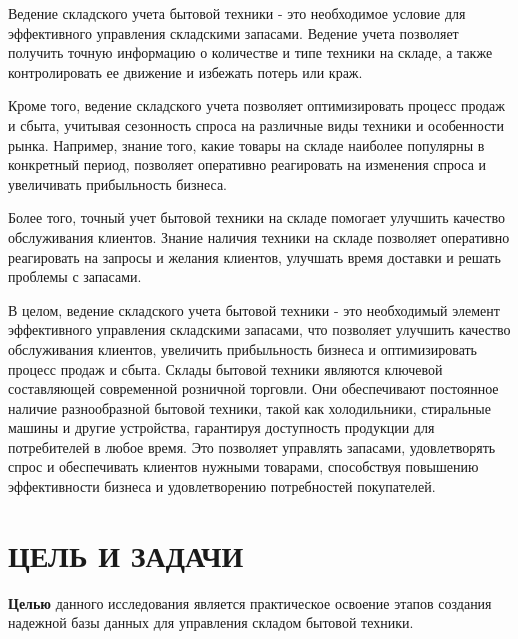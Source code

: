 \documentclass[14pt]{extreport}
\begin{document}
\setlength{\parindent}{1.25cm} %
\pagestyle{empty}


\pagestyle{plain} %

\tableofcontents

\intro\label{intro}

Ведение складского учета бытовой техники - это необходимое условие для эффективного управления складскими запасами. Ведение учета позволяет получить точную информацию о количестве и типе техники на складе, а также контролировать ее движение и избежать потерь или краж.

Кроме того, ведение складского учета позволяет оптимизировать процесс продаж и сбыта, учитывая сезонность спроса на различные виды техники и особенности рынка. Например, знание того, какие товары на складе наиболее популярны в конкретный период, позволяет оперативно реагировать на изменения спроса и увеличивать прибыльность бизнеса.

Более того, точный учет бытовой техники на складе помогает улучшить качество обслуживания клиентов. Знание наличия техники на складе позволяет оперативно реагировать на запросы и желания клиентов, улучшать время доставки и решать проблемы с запасами.

В целом, ведение складского учета бытовой техники - это необходимый элемент эффективного управления складскими запасами, что позволяет улучшить качество обслуживания клиентов, увеличить прибыльность бизнеса и оптимизировать процесс продаж и сбыта. Склады бытовой техники являются ключевой составляющей современной розничной торговли. Они обеспечивают постоянное наличие разнообразной бытовой техники, такой как холодильники, стиральные машины и другие устройства, гарантируя доступность продукции для потребителей в любое время. Это позволяет управлять запасами, удовлетворять спрос и обеспечивать клиентов нужными товарами, способствуя повышению эффективности бизнеса и удовлетворению потребностей покупателей.


\newpage
\chapter{ЦЕЛЬ И ЗАДАЧИ}
\textbf{Целью }данного исследования является практическое освоение этапов создания надежной базы данных для управления складом бытовой техники.
\end{document}
